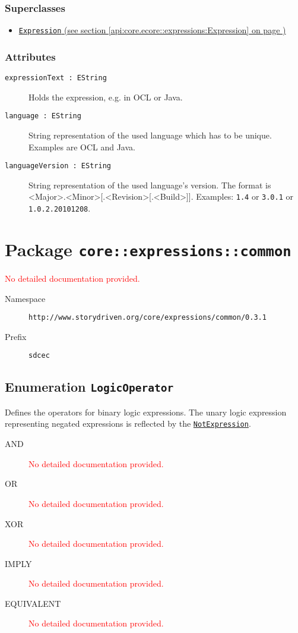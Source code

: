 \subsubsection*{Superclasses}
\begin{itemize}
\item \hyperref[api:core.ecore::expressions:Expression]{\texttt{Expression} (see section \ref*{api:core.ecore::expressions:Expression} on page \pageref*{api:core.ecore::expressions:Expression})}
\end{itemize}
\subsubsection*{Attributes}
\begin{description}
\item[\texttt{expressionText~:~EString}] Holds the expression, e.g. in OCL or Java.
\item[\texttt{language~:~EString}] String representation of the used language which has to be unique. Examples are OCL and Java.
\item[\texttt{languageVersion~:~EString}] String representation of the used language's version. The format is <Major>.<Minor>[.<Revision>[.<Build>]]. Examples: \texttt{1.4} or \texttt{3.0.1} or \texttt{1.0.2.20101208}.
\end{description}
\section{Package \texttt{core::expressions::common}}
\label{api:core.ecore::expressions:common}
\textcolor{red}{No detailed documentation provided.}
\begin{description}
\item[Namespace] \texttt{http://www.storydriven.org/core/expressions/common/0.3.1}
\item[Prefix] \texttt{sdcec}
\end{description}
\subsection{Enumeration \texttt{LogicOperator}}
Defines the operators for binary logic expressions. The unary logic expression representing negated expressions is reflected by the \hyperref[NotExpression]{\texttt{NotExpression}}.
\begin{description}
\item[AND] \textcolor{red}{No detailed documentation provided.}
\item[OR] \textcolor{red}{No detailed documentation provided.}
\item[XOR] \textcolor{red}{No detailed documentation provided.}
\item[IMPLY] \textcolor{red}{No detailed documentation provided.}
\item[EQUIVALENT] \textcolor{red}{No detailed documentation provided.}
\end{description}
